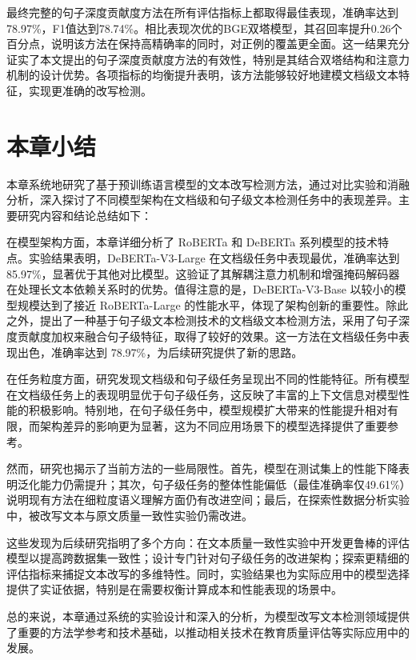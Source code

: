 最终完整的句子深度贡献度方法在所有评估指标上都取得最佳表现，准确率达到78.97\%，F1值达到78.74\%。相比表现次优的BGE双塔模型，其召回率提升0.26个百分点，说明该方法在保持高精确率的同时，对正例的覆盖更全面。这一结果充分证实了本文提出的句子深度贡献度方法的有效性，特别是其结合双塔结构和注意力机制的设计优势。各项指标的均衡提升表明，该方法能够较好地建模文档级文本特征，实现更准确的改写检测。

\section{本章小结}
\label{sec:method-conclusion}

本章系统地研究了基于预训练语言模型的文本改写检测方法，通过对比实验和消融分析，深入探讨了不同模型架构在文档级和句子级文本检测任务中的表现差异。主要研究内容和结论总结如下：

在模型架构方面，本章详细分析了 RoBERTa 和 DeBERTa 系列模型的技术特点。实验结果表明，DeBERTa-V3-Large 在文档级任务中表现最优，准确率达到 85.97\%，显著优于其他对比模型。这验证了其解耦注意力机制和增强掩码解码器在处理长文本依赖关系时的优势。值得注意的是，DeBERTa-V3-Base 以较小的模型规模达到了接近 RoBERTa-Large 的性能水平，体现了架构创新的重要性。除此之外，提出了一种基于句子级文本检测技术的文档级文本检测方法，采用了句子深度贡献度加权来融合句子级特征，取得了较好的效果。这一方法在文档级任务中表现出色，准确率达到 78.97\%，为后续研究提供了新的思路。

在任务粒度方面，研究发现文档级和句子级任务呈现出不同的性能特征。所有模型在文档级任务上的表现明显优于句子级任务，这反映了丰富的上下文信息对模型性能的积极影响。特别地，在句子级任务中，模型规模扩大带来的性能提升相对有限，而架构差异的影响更为显著，这为不同应用场景下的模型选择提供了重要参考。

然而，研究也揭示了当前方法的一些局限性。首先，模型在测试集上的性能下降表明泛化能力仍需提升；其次，句子级任务的整体性能偏低（最佳准确率仅49.61\%）说明现有方法在细粒度语义理解方面仍有改进空间；最后，在探索性数据分析实验中，被改写文本与原文质量一致性实验仍需改进。

这些发现为后续研究指明了多个方向：在文本质量一致性实验中开发更鲁棒的评估模型以提高跨数据集一致性；设计专门针对句子级任务的改进架构；探索更精细的评估指标来捕捉文本改写的多维特性。同时，实验结果也为实际应用中的模型选择提供了实证依据，特别是在需要权衡计算成本和性能表现的场景中。

总的来说，本章通过系统的实验设计和深入的分析，为模型改写文本检测领域提供了重要的方法学参考和技术基础，以推动相关技术在教育质量评估等实际应用中的发展。